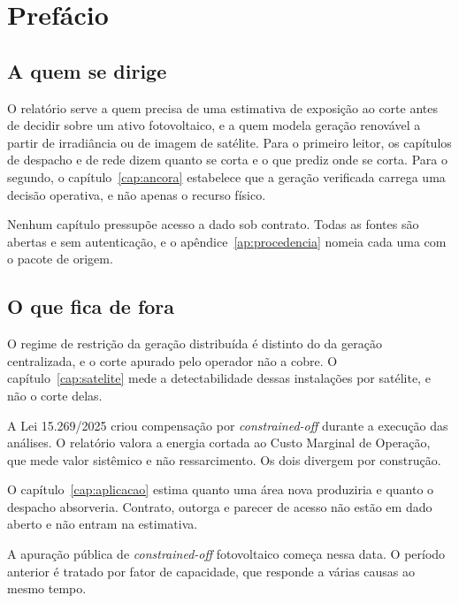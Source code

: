 
\chapter*{Prefácio}

\section*{A quem se dirige}

O relatório serve a quem precisa de uma estimativa de exposição ao corte antes
de decidir sobre um ativo fotovoltaico, e a quem modela geração renovável a
partir de irradiância ou de imagem de satélite. Para o primeiro leitor, os
capítulos de despacho e de rede dizem quanto se corta e o que prediz onde se
corta. Para o segundo, o capítulo~\ref{cap:ancora} estabelece que a geração
verificada carrega uma decisão operativa, e não apenas o recurso físico.

Nenhum capítulo pressupõe acesso a dado sob contrato. Todas as fontes são
abertas e sem autenticação, e o apêndice~\ref{ap:procedencia} nomeia cada uma
com o pacote de origem.

\section*{O que fica de fora}

 O regime de restrição da geração
distribuída é distinto do da geração centralizada, e o corte apurado pelo
operador não a cobre. O capítulo~\ref{cap:satelite} mede a detectabilidade
dessas instalações por satélite, e não o corte delas.

 A Lei 15.269/2025 criou compensação por
\textit{constrained-off} durante a execução das análises. O relatório valora a
energia cortada ao Custo Marginal de Operação, que mede valor sistêmico e não
ressarcimento. Os dois divergem por construção.

 O capítulo~\ref{cap:aplicacao} estima quanto
uma área nova produziria e quanto o despacho absorveria. Contrato, outorga e
parecer de acesso não estão em dado aberto e não entram na estimativa.

 A apuração pública de
\textit{constrained-off} fotovoltaico começa nessa data. O período anterior é
tratado por fator de capacidade, que responde a várias causas ao mesmo tempo.
